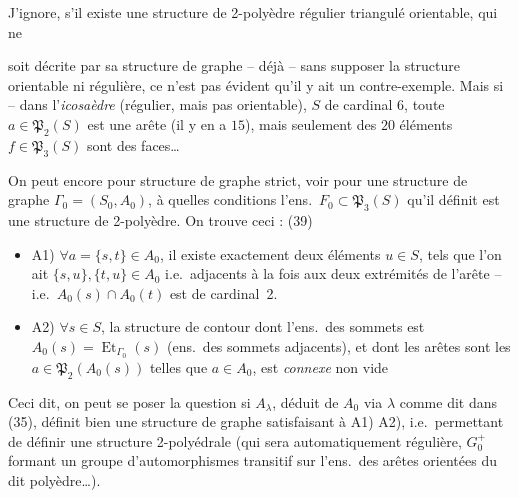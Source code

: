 \documentclass[11pt,a4paper]{article}
\begin{document}
J'ignore, s'il existe une structure de 2-polyèdre régulier  triangulé orientable, qui ne

soit  décrite par sa structure de graphe -- déjà --   sans supposer la structure orientable ni régulière, ce n'est pas évident qu'il y ait un contre-exemple. \struck{\ill{}} Mais si -- dans l'\emph{icosaèdre } (régulier, mais pas orientable), $S$ de cardinal $6$, \struck{\ill{}} toute $a \in \mathfrak{P}_2(S)$ est une arête (il y en a $15$), mais seulement \ill{} des $20$ éléments $f \in \mathfrak{P}_3(S)$ sont des faces…

 On peut encore \struck{\ill{}}  pour  structure de graphe strict, voir pour une structure de graphe $\Gamma_0 = (S_0, A_0)$, à quelles conditions l'ens.\ $F_0 \subset \mathfrak{P}_3(S)$ qu'il définit est une structure de 2-polyèdre. On trouve ceci :
(39)
\begin{itemize}
\item A1) $\forall a = \{s, t\} \in A_0$, il existe exactement deux éléments $u \in S$, tels que l'on ait $\{s, u\}, \{t, u\} \in A_0$ i.e.\ adjacents à la fois aux deux extrémités de l'arête -- i.e.\ $A_0(s) \cap A_0(t)$ est de cardinal~2.
\item A2) $\forall s \in S$, la structure de contour dont l'ens.\ des sommets est $A_0(s) = \operatorname{Et}_{\Gamma_0}(s)$ (ens.\ des sommets adjacents), et dont les arêtes sont les $a \in \mathfrak{P}_2(A_0(s))$ telles que $a \in A_0$, est \emph{connexe} non vide 
\end{itemize}

Ceci dit, on peut se poser la question si $A_\lambda$, déduit de $A_0$ via $\lambda$ comme dit dans (35), définit bien une structure de graphe satisfaisant à A1) A2), i.e.\ permettant de définir une structure 2-polyédrale (qui sera automatiquement régulière, $G_0^{+}$ formant un groupe d'automorphismes   transitif sur l'ens.\ des arêtes orientées du dit polyèdre…).
\end{document}
